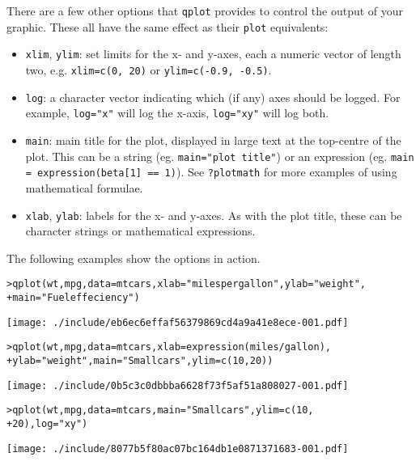 There are a few other options that {\tt qplot} provides to control the output of your graphic.  These all have the same effect as their {\tt plot} equivalents:

\begin{itemize}
	\item {\tt xlim}, {\tt ylim}: set limits for the x- and y-axes, each a numeric vector of length two, e.g. {\tt xlim=c(0, 20)} or {\tt ylim=c(-0.9, -0.5)}.
	\item {\tt log}: a character vector indicating which (if any) axes should be logged.  For example, {\tt log="x"} will log the x-axis, {\tt log="xy"} will log both.
	\item {\tt main}: main title for the plot, displayed in large text at the top-centre of the plot.  This can be a string (eg. {\tt main="plot title"}) or an expression (eg. {\tt main = expression(beta[1] == 1)}).  See {\tt ?plotmath} for more examples of using mathematical formulae.
	\item {\tt xlab}, {\tt ylab}: labels for the x- and y-axes.  As with the plot title, these can be character strings or mathematical expressions.
\end{itemize}

The following examples show the options in action.

\begin{alltt}
> qplot(wt, mpg, data = mtcars, xlab = "miles per gallon", ylab = "weight", 
+     main = "Fuel effeciency")
\end{alltt}
\texttt{[image: ./include/eb6ec6effaf56379869cd4a9a41e8ece-001.pdf]}
\begin{alltt}

> qplot(wt, mpg, data = mtcars, xlab = expression(miles/gallon), 
+     ylab = "weight", main = "Small cars", ylim = c(10, 20))
\end{alltt}
\texttt{[image: ./include/0b5c3c0dbbba6628f73f5af51a808027-001.pdf]}
\begin{alltt}

> qplot(wt, mpg, data = mtcars, main = "Small cars", ylim = c(10, 
+     20), log = "xy")
\end{alltt}
\texttt{[image: ./include/8077b5f80ac07bc164db1e0871371683-001.pdf]}
\begin{alltt}

\end{alltt}


